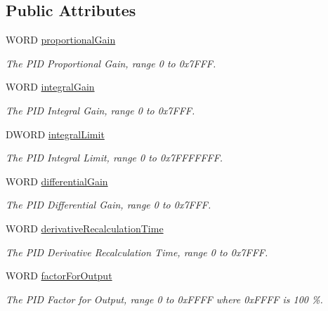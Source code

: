 \subsection*{Public Attributes}
\begin{DoxyCompactItemize}
\item 
W\+O\+RD \hyperlink{struct_m_o_t___brushless_position_loop_parameters_a7cb9c7bde38c08a107f23c2047831883}{proportional\+Gain}
\begin{DoxyCompactList}\small\item\em The P\+ID Proportional Gain, range 0 to 0x7\+F\+FF. \end{DoxyCompactList}\item 
W\+O\+RD \hyperlink{struct_m_o_t___brushless_position_loop_parameters_a0273c9a1ce5719bd31f04a42c530a2d1}{integral\+Gain}
\begin{DoxyCompactList}\small\item\em The P\+ID Integral Gain, range 0 to 0x7\+F\+FF. \end{DoxyCompactList}\item 
D\+W\+O\+RD \hyperlink{struct_m_o_t___brushless_position_loop_parameters_a7b8b0a0fc58d60026af30627c3b80355}{integral\+Limit}
\begin{DoxyCompactList}\small\item\em The P\+ID Integral Limit, range 0 to 0x7\+F\+F\+F\+F\+F\+FF. \end{DoxyCompactList}\item 
W\+O\+RD \hyperlink{struct_m_o_t___brushless_position_loop_parameters_a43d011b77bff1dea322c3094843fc7c5}{differential\+Gain}
\begin{DoxyCompactList}\small\item\em The P\+ID Differential Gain, range 0 to 0x7\+F\+FF. \end{DoxyCompactList}\item 
W\+O\+RD \hyperlink{struct_m_o_t___brushless_position_loop_parameters_aa2527a45a318f3d34974eae6658833ed}{derivative\+Recalculation\+Time}
\begin{DoxyCompactList}\small\item\em The P\+ID Derivative Recalculation Time, range 0 to 0x7\+F\+FF. \end{DoxyCompactList}\item 
W\+O\+RD \hyperlink{struct_m_o_t___brushless_position_loop_parameters_a1cd79ba1eca19580b5231cdb3f627957}{factor\+For\+Output}
\begin{DoxyCompactList}\small\item\em The P\+ID Factor for Output, range 0 to 0x\+F\+F\+FF where 0x\+F\+F\+FF is 100 \%. \end{DoxyCompactList}\item 

\end{DoxyCompactItemize}
